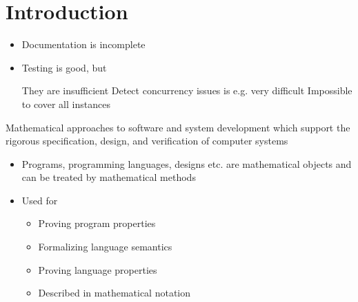 
\section{Introduction}
\begin{itemize}
        \begin{itemize}
            \item Documentation is incomplete
            \item Testing is good, but
                \begin{itemize}
                    \icon They are insufficient
                    \icon Detect concurrency issues is e.g. very difficult
                    \icon Impossible to cover all instances
                \end{itemize}
        \end{itemize}
     Mathematical approaches to software and system development which support the rigorous specification, design, and verification of computer systems
        \begin{itemize}
            \item Programs, programming languages, designs etc. are mathematical objects and can be treated by mathematical methods
            \item Used for
                \begin{itemize}
                    \item Proving program properties
                    \item Formalizing language semantics
                    \item Proving language properties
                \end{itemize}
                \begin{itemize}
                        \begin{itemize}
                             What does the system look like?
                             What should the system do?
                             What do we assume?
                                \begin{itemize}
                                    \item E.g. an attacker cannot break a encryption
                                \end{itemize}
                            \item Described in mathematical notation

\end{itemize}
\end{itemize}
\end{itemize}
\end{itemize}
